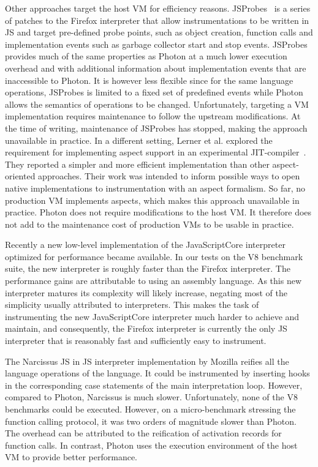 Other approaches target the host VM for efficiency reasons.
JSProbes~\cite{jsprobes:2012} is a series of patches to the Firefox interpreter
that allow instrumentations to be written in JS and target pre-defined probe
points, such as object creation, function calls and implementation events such
as garbage collector start and stop events. JSProbes provides much of the same
properties as Photon at a much lower execution overhead and with additional
information about implementation events that are inaccessible to Photon. It is
however less flexible since for the same language operations, JSProbes is
limited to a fixed set of predefined events while Photon allows the semantics
of operations to be changed. Unfortunately, targeting a VM implementation
requires maintenance to follow the upstream modifications. At the time of
writing, maintenance of JSProbes has stopped, making the approach unavailable
in practice.  In a different setting, Lerner et al. explored the requirement
for implementing aspect support in an experimental
JIT-compiler~\cite{Lerner:2010}. They reported a simpler and more efficient
implementation than other aspect-oriented approaches. Their work was intended
to inform possible ways to open native implementations to instrumentation with
an aspect formalism. So far, no production VM implements aspects, which makes
this approach unavailable in practice. Photon does not require modifications to
the host VM. It therefore does not add to the maintenance cost of production
VMs to be usable in practice. 

Recently a new low-level implementation of the JavaScriptCore
interpreter optimized for performance became available.  In our tests
on the V8 benchmark suite, the new interpreter is roughly 
faster than the Firefox interpreter.  The performance gains are
attributable to using an assembly language.  As this new interpreter
matures its complexity will likely increase, negating most of the
simplicity usually attributed to interpreters.  This makes the task of
instrumenting the new JavaScriptCore interpreter much harder to
achieve and maintain, and consequently, the Firefox interpreter is
currently the only JS interpreter that is reasonably fast and
sufficiently easy to instrument.  

The Narcissus JS in JS interpreter implementation by Mozilla reifies all the
language operations of the language. It could be instrumented by inserting
hooks in the corresponding case statements of the main interpretation loop.
However, compared to Photon, Narcissus is much slower. Unfortunately, none of
the V8 benchmarks could be executed. However, on a micro-benchmark stressing
the function calling protocol, it was two orders of magnitude slower than
Photon. The overhead can be attributed to the reification of activation records
for function calls. In contrast, Photon uses the execution environment of the
host VM to provide better performance.
